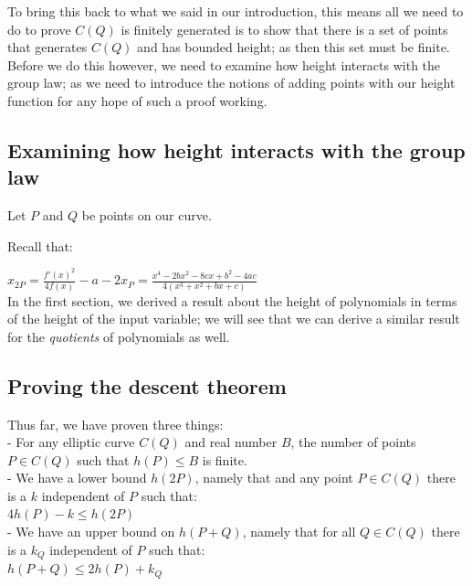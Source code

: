 \documentclass{article}
\begin{document}
To bring this back to what we said in our introduction, this means all we need to do to prove $C(Q)$ is finitely generated is to show that there is a set of points that generates $C(Q)$ and has bounded height; as then this set must be finite. Before we do this however, we need to examine how height interacts with the group law; as we need to introduce the notions of adding points with our height function for any hope of such a proof working.\\

\subsection{Examining how height interacts with the group law}

Let $P$ and $Q$ be points on our curve.

Recall that:

$x_{2P} = \frac{f'(x)^2}{4 f(x)} - a - 2x_P = \frac{x^4 - 2bx^2 - 8cx + b^2 - 4ac}{4(x^3 +x^2 + bx + c)}$\\

In the first section, we derived a result about the height of polynomials in terms of the height of the input variable; we will see that we can derive a similar result for the \emph{quotients} of polynomials as well. \\

\subsection{Proving the descent theorem}

Thus far, we have proven three things:\\

- For any elliptic curve $C(Q)$ and  real number $B$, the number of points $P \in C(Q)$ such that $h(P) \leq B$ is finite.\\

- We have a lower bound $h(2P)$, namely that and any point $P \in C(Q)$ there is a $k$ independent of $P$ such that:\\

$4h(P) - k \leq h(2P) $\\

- We have an upper bound on $h(P + Q)$, namely that for all $Q \in C(Q)$ there is a $k_Q$ independent of $P$ such that:\\

$h(P + Q) \leq 2h(P) + k_Q$\\
\end{document}
